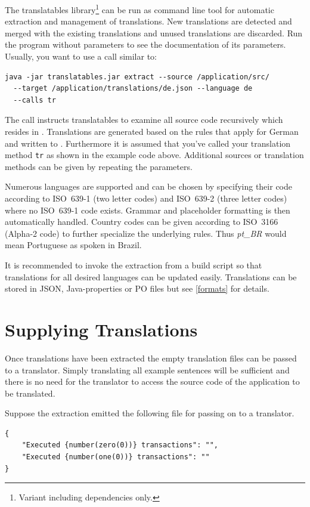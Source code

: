 \documentclass[a4paper,11pt,twoside]{report}
\begin{document}
The translatables library\footnote{Variant including dependencies only.} can be run as command line tool for automatic extraction and management of translations. New translations are detected and merged with the existing translations and unused translations are discarded. Run the program without parameters to see the documentation of its parameters. Usually, you want to use a call similar to:
\begin{verbatim}
java -jar translatables.jar extract --source /application/src/
  --target /application/translations/de.json --language de
  --calls tr
\end{verbatim} 
The call instructs translatables to examine all source code recursively which resides in . Translations are generated based on the rules that apply for German and written to . Furthermore it is assumed that you've called your translation method \lstinline$tr$ as shown in the example code above. Additional sources or translation methods can be given by repeating the parameters.

Numerous languages are supported and can be chosen by specifying their code according to \ac{ISO} 639-1 (two letter codes) and \ac{ISO} 639-2 (three letter codes) where no \ac{ISO} 639-1 code exists. Grammar and placeholder formatting is then automatically handled. Country codes can be given according to \ac{ISO} 3166 (Alpha-2 code) to further specialize the underlying rules. Thus \textit{pt\_BR} would mean Portuguese as spoken in Brazil.

It is recommended to invoke the extraction from a build script so that translations for all desired languages can be updated easily. Translations can be stored in \ac{JSON}, Java-properties or \ac{PO} files but see \vref{formats} for details.

\section{Supplying Translations}
Once translations have been extracted the empty translation files can be passed to a translator. Simply translating all example sentences will be sufficient and there is no need for the translator to access the source code of the application to be translated.

Suppose the extraction emitted the following file for passing on to a translator.
\begin{lstlisting}
{
	"Executed {number(zero(0))} transactions": "",
	"Executed {number(one(0))} transactions": ""
}
\end{lstlisting}
\end{document}

